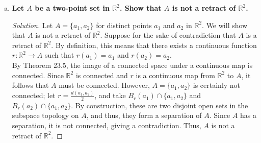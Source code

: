 \documentclass[11pt]{article}
\newcommand{\R}{\mathbb{R}}
\newenvironment{solution}
  {\renewcommand\qedsymbol{$\blacksquare$}\begin{proof}[Solution]}
  {\end{proof}}
\begin{document}
\begin{enumerate}[a)]
\begin{solution}
    Next, we show that $z$ is contained in $(r^{-1}(U_{\tilde{y}} \, \cap \, Y)) \cap U_z$. By construction, $z \in U_z$. Furthermore, since by construction, $r(z) = \tilde{y}$ and $\tilde{y} \in Y \cap U_y$, we have that
    $z \in r^{-1}(U_{\tilde{y}} \, \cap \, Y)$. Thus, since $z \in U_z$ and $z \in r^{-1}(U_{\tilde{y}}) \cap \, Y$, it follows that $z \in (r^{-1}(U_{\tilde{y}} \, \cap \, Y)) \cap U_z$. \\

    Finally, we show that $Y$ and $(r^{-1}(U_{\tilde{y}} \, \cap \, Y)) \cap U_z$ are disjoint, to show that $(r^{-1}(U_{\tilde{y}} \, \cap \, Y)) \cap U_z$ is actually a neighborhood of $z$ in $Z \setminus Y$. Suppose for the sake of contradiction that there exists some $y \in Y$ such that
    $y \in (r^{-1}(U_{\tilde{y}} \, \cap \, Y)) \cap U_z$. Then $y \in U_z$ and $y \in (r^{-1}(U_{\tilde{y}} \, \cap \, Y))$. The latter condition, coupled with the continuity of $r$, tells us that $r(y) \in U_{\tilde{y}} \cap Y$, so $r(y) \in U_{\tilde{y}}$. Note however that
    since $Y$ is a retraction of $Z$, $r(y) = y$ by definition. Consequently, we have that $y = r(y) \in U_{\tilde{y}}$ and $y \in U_{z}$, so $y$ is in both $U_{\tilde{y}}$ and $U_z$. However, this contradicts
    the construction of $U_{\tilde{y}}$ and $U_z$, which were defined to be disjoint neighborhoods in $Z$. Thus, we know that  $Y$ and $(r^{-1}(U_{\tilde{y}} \, \cap \, Y)) \cap U_z$ are disjoint. \\

    To summarize, for an arbitrary element $z \in Z \setminus Y$, we constructed a neighborhood $(r^{-1}(U_{\tilde{y}} \, \cap \, Y)) \cap U_z$ which is open in $Z \setminus Y$. Thus, $Z \setminus Y$ is open and so equivalently, $Y$ is closed in $Z$.
\end{solution}

    \item \textbf{Let $A$ be a two-point set in $\R^2$. Show that $A$ is not a retract of $\R^2$.}
    \begin{solution}
    Let $A = \{ a_1, a_2 \}$ for distinct points $a_1$ and $a_2$ in $\R^2$. We will show that $A$ is not a retract of $\R^2$. Suppose for the sake of contradiction that $A$ is a retract of $\R^2$. By definition, this means that
    there exists a continuous function $r\colon \R^2 \rightarrow A$ such that $r(a_1) = a_1$ and $r(a_2) = a_2$. \\

    By Theorem 23.5, the image of a connected space under a continuous map is connected. Since $\R^2$ is connected and $r$ is a continuous map from $\R^2$ to $A$, it follows that $A$ must be connected. However, $A = \{ a_1, a_2 \}$
    is certainly not connected; let $r = \frac{d(a_1, a_2)}{2}$, and take $B_r(a_1) \cap \{a_1, a_2\}$ and $B_r(a_2) \cap \{a_1, a_2\}$. By construction, these are two disjoint open sets in the subspace topology on $A$, and thus, they form
    a separation of $A$. Since $A$ has a separation, it is not connected, giving a contradiction. Thus, $A$ is not a retract of $\R^2$. 
    \end{solution}
\end{enumerate}

\newpage
\end{document}
